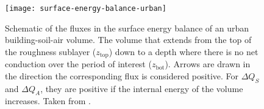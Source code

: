 				\begin{figure}	
			\centering
			\texttt{[image: surface-energy-balance-urban]}
			\caption{
				Schematic of the fluxes in the surface energy balance of an urban building-soil-air volume. 
				The volume that extends from the top of the roughness sublayer ($z_\text{top}$) down to a depth where there is no net conduction over the period of interest ($z_\text{bot}$).
				Arrows are drawn in the direction the corresponding flux is considered positive.
				For $\Delta Q_S$ and $\Delta Q_A$, they are positive if the internal energy of the volume increases.
				Taken from \textcite{Oke2017urban}.
			}
			\label{fig:surface-energy-balance-urban}
		\end{figure}
	


%
%
%	
%	
%
%	
%
%
%
%
%	
